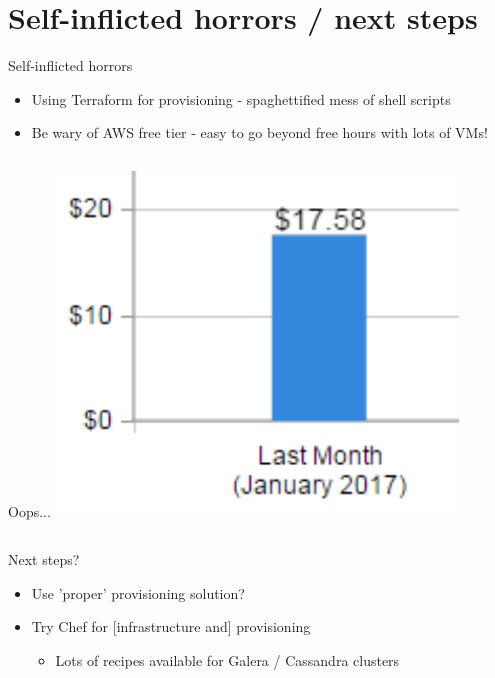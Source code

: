 \documentclass[xcolor=dvipsnames]{beamer}
\begin{document}
\section[Next steps]{Self-inflicted horrors / next steps}
\begin{frame}{Self-inflicted horrors}
\begin{itemize}
  \item Using Terraform for provisioning - spaghettified mess of shell scripts
  \item Be wary of AWS free tier - easy to go beyond free hours with lots of VMs!
\end{itemize}
\pause
\begin{columns}
  \centering
  \begin{column}{0.5\textwidth}
    \begin{block}{Oops...}
      \centering
      \includegraphics[width=0.8\textwidth]{AWSbilling.png}
    \end{block}
  \end{column}
\end{columns}
\end{frame}

\begin{frame}{Next steps?}
  \begin{itemize}
    \item Use 'proper' provisioning solution?
    \item Try Chef for [infrastructure and] provisioning
    \begin{itemize}
      \item Lots of recipes available for Galera / Cassandra clusters
    \end{itemize}
  \end{itemize}
\end{frame}
\end{document}
